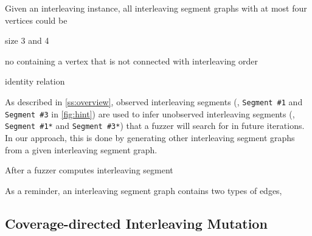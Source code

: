 Given an interleaving instance, all interleaving segment graphs with
at most four vertices could be 


size 3 and 4

no containing a vertex that is not connected with interleaving order

identity relation





%
As described in \autoref{ss:overview}, observed interleaving segments
(\eg, \texttt{Segment \#1} and \texttt{Segment \#3} in
\autoref{fig:hint}) are used to infer unobserved interleaving segments
(\eg, \texttt{Segment \#1*} and \texttt{Segment \#3*}) that a fuzzer
will search for in future iterations.
%
In our approach, this is done by generating other interleaving segment
graphs from a given interleaving segment graph.

After a fuzzer computes interleaving segment 

As a reminder, an interleaving segment graph contains two types of
edges, 








\subsection{Coverage-directed Interleaving Mutation}
\label{ss:scheduler}



